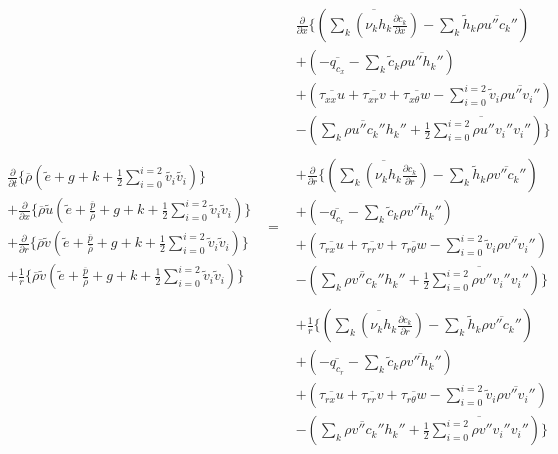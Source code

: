 \begin{equation}
	\begin{array}{ccc}
	   \begin{array}{c}
		\frac{\partial}{\partial t}\Big\{\overline{\rho}(\tilde e + g + k 
		+ \frac{1}{2}\sum_{i=0}^{i=2}\tilde{v_i}\tilde{v_i}) \Big\}  \\
		+ \frac{\partial}{\partial x}\Big\{\overline{\rho}\tilde u(\tilde e + \frac{\overline{p}}{\overline{\rho}}  
		+ g + k + \frac{1}{2}\sum_{i=0}^{i=2}\tilde v_i \tilde v_i)\Big\}  \\
		+ \frac{\partial}{\partial r}\Big\{\overline{\rho}\tilde v(\tilde e + \frac{\overline{p}}{\overline{\rho}}  
		+ g + k + \frac{1}{2}\sum_{i=0}^{i=2}\tilde v_i \tilde v_i)\Big\}  \\
		+ \frac{1}{r}\Big\{\overline{\rho}\tilde v(\tilde e + \frac{\overline{p}}{\overline{\rho}}  
		+ g + k + \frac{1}{2}\sum_{i=0}^{i=2}\tilde v_i \tilde v_i)\Big\}
	   \end{array} 
	   & = &
	   \begin{array}{c}
		\frac{\partial}{\partial x}\Big\{
		(\overline{\sum_k (\nu_k h_k\frac{\partial c_k}{\partial x})} - \sum_k \tilde h_k \overline{\rho u'' c_k''}) 
		\\ +(- \overline{q_{c_x}} - \sum_k \tilde c_k \overline{\rho u'' h_k''}) \\ + (\overline{\tau_{xx}u} + 
		\overline{\tau_{xr}v} + \overline{\tau_{x\theta}w}
		- \sum_{i=0}^{i=2}\tilde v_i \overline{\rho u'' v_i''}) \\ - (\overline{\sum_k \rho u'' c_k'' h_k''} 
		+ \frac{1}{2}\overline{\sum_{i=0}^{i=2} \rho u'' v_i'' v_i''}) \Big\} 
		\\ \\ + 
		\frac{\partial}{\partial r}\Big\{
		(\overline{\sum_k (\nu_k h_k\frac{\partial c_k}{\partial r})} - \sum_k \tilde h_k \overline{\rho v'' c_k''}) 
		\\ +(- \overline{q_{c_r}} - \sum_k \tilde c_k \overline{\rho v'' h_k''}) \\ + (\overline{\tau_{rx}u} + 
		\overline{\tau_{rr}v} + \overline{\tau_{r\theta}w}
		- \sum_{i=0}^{i=2}\tilde v_i \overline{\rho v'' v_i''}) \\ - (\overline{\sum_k \rho v'' c_k'' h_k''} 
		+ \frac{1}{2}\overline{\sum_{i=0}^{i=2} \rho v'' v_i'' v_i''}) \Big\} 
		\\ \\+ 
		\frac{1}{r}\Big\{
		(\overline{\sum_k (\nu_k h_k\frac{\partial c_k}{\partial r})} - \sum_k \tilde h_k \overline{\rho v'' c_k''}) 
		\\ +(- \overline{q_{c_r}} - \sum_k \tilde c_k \overline{\rho v'' h_k''}) \\ + (\overline{\tau_{rx}u} + 
		\overline{\tau_{rr}v} + \overline{\tau_{r\theta}w}
		- \sum_{i=0}^{i=2}\tilde v_i \overline{\rho v'' v_i''}) \\ - (\overline{\sum_k \rho v'' c_k'' h_k''} 
		+ \frac{1}{2}\overline{\sum_{i=0}^{i=2} \rho v'' v_i'' v_i''}) \Big\} 
	   \end{array}	
	\end{array}
\label{eqn:invenergyturb}
\end{equation}

